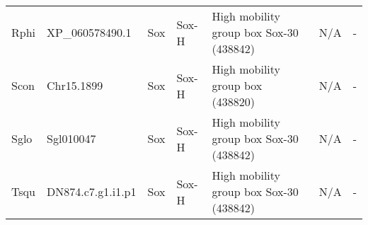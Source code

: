 \documentclass[../main.tex]{subfiles}
\begin{document}
\begin{landscape}
\begin{longtable}{lllllll}
		Rphi           & XP\_060578490.1       & Sox            & Sox-H               & High mobility group box Sox-30 (438842)     & N/A                                                                    & -                    \\
		Scon           & Chr15.1899            & Sox            & Sox-H               & High mobility group box (438820)            & N/A                                                                    & -                    \\
		Sglo           & Sgl010047             & Sox            & Sox-H               & High mobility group box Sox-30 (438842)     & N/A                                                                    & -                    \\
		Tsqu           & DN874.c7.g1.i1.p1     & Sox            & Sox-H               & High mobility group box Sox-30 (438842)     & N/A                                                                    & -                    \\* \bottomrule \bottomrule
	\end{longtable}
\end{landscape}
\end{document}
